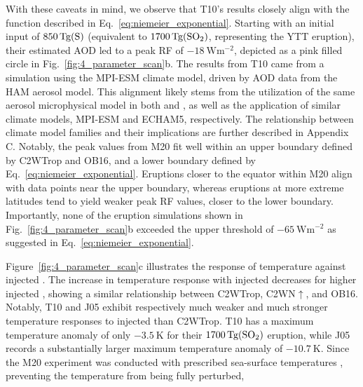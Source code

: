 \documentclass[draft]{agujournal2019}
\begin{document}
  With these caveats in mind, we observe that T10's results closely align with the
  function described in Eq.~\ref{eq:niemeier_exponential}. Starting with an initial
  input of \(\SI{850}{\tera\gram(\ce{S})}\) (equivalent to
  \(\SI{1700}{\tera\gram(\ce{SO2})}\), representing the YTT eruption), their estimated
  AOD led to a peak RF of \(\SI{-18}{\watt\meter^{-2}}\), depicted as a pink filled
  circle in Fig.~\ref{fig:4_parameter_scan}b. The results from T10 came from a
  simulation using the MPI-ESM climate model, driven by AOD data from the HAM aerosol
  model. This alignment likely stems from the utilization of the same aerosol
  microphysical model in both  and , as well as
  the application of similar climate models, MPI-ESM and ECHAM5, respectively. The
  relationship between climate model families and their implications are further
  described in Appendix C. Notably, the peak values from M20 fit well within an upper
  boundary defined by C2WTrop and OB16, and a lower boundary defined by
  Eq.~\ref{eq:niemeier_exponential}. Eruptions closer to the equator within M20 align
  with data points near the upper boundary, whereas eruptions at more extreme latitudes
  tend to yield weaker peak RF values, closer to the lower boundary. Importantly, none
  of the eruption simulations shown in Fig.~\ref{fig:4_parameter_scan}b exceeded the
  upper threshold of \(\SI{-65}{\watt\meter^{-2}}\) as suggested in
  Eq.~\ref{eq:niemeier_exponential}.

  Figure~\ref{fig:4_parameter_scan}c illustrates the response of temperature against
  injected . The increase in temperature response with injected 
  decreases for higher injected , showing a similar relationship between
  C2WTrop, C2WN\(\uparrow\), and OB16. Notably, T10 and J05 exhibit respectively much
  weaker and much stronger temperature responses to injected  than C2WTrop. T10
  has a maximum temperature anomaly of only \(\SI{-3.5}{\kelvin}\) for their
  \(\SI{1700}{\tera\gram(\ce{SO2})}\) eruption, while J05 records a substantially larger
  maximum temperature anomaly of \(\SI{-10.7}{\kelvin}\). Since the M20 experiment was
  conducted with prescribed sea-surface temperatures \cite{marshall2020}, preventing the
  temperature from being fully perturbed, 
\end{document}
